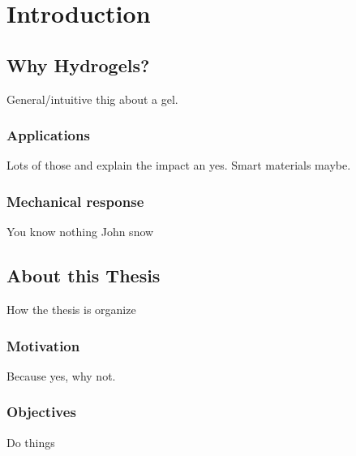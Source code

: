 \chapter{Introduction}\label{ch1:Intro}

\section{Why Hydrogels?}

General/intuitive thig about a gel.

\subsection{Applications}

Lots of those and explain the impact an yes.
Smart materials maybe.

\subsection{Mechanical response}

You know nothing John snow

\section{About this Thesis}

How the thesis is organize

\subsection{Motivation}

Because yes, why not.

\subsection{Objectives}

Do things


